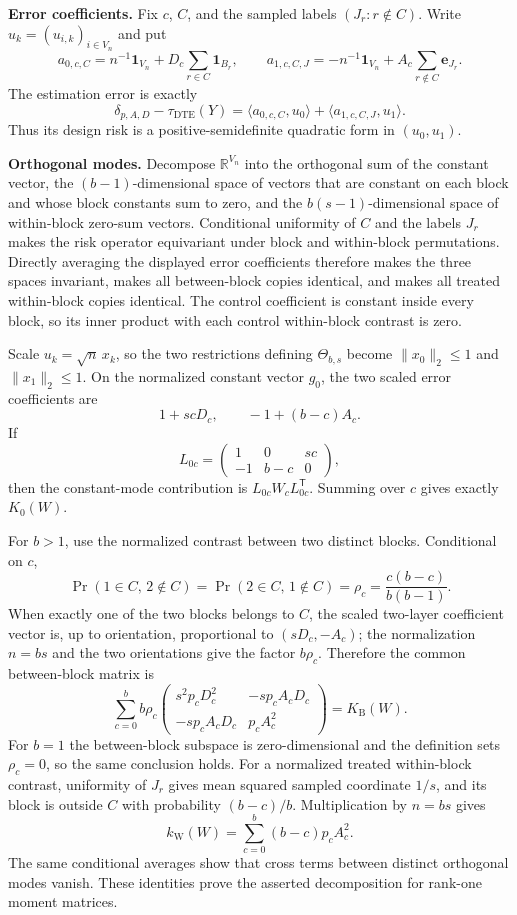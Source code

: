 \textbf{Error coefficients.}  Fix \(c\), \(C\), and the sampled labels \((J_r:r\notin C)\).  Write \(u_k=(u_{i,k})_{i\in V_n}\) and put
\[
a_{0,c,C}=n^{-1}\mathbf 1_{V_n}+D_c\sum_{r\in C}\mathbf 1_{B_r},
\qquad
a_{1,c,C,J}=-n^{-1}\mathbf 1_{V_n}+A_c\sum_{r\notin C}\mathbf e_{J_r}.
\]
The estimation error is exactly
\[
\delta_{p,A,D}-\tau_{\mathrm{DTE}}(Y)
=\langle a_{0,c,C},u_0\rangle+\langle a_{1,c,C,J},u_1\rangle.
\]
Thus its design risk is a positive-semidefinite quadratic form in \((u_0,u_1)\).

\textbf{Orthogonal modes.}  Decompose \(\mathbb R^{V_n}\) into the orthogonal sum of the constant vector, the \((b-1)\)-dimensional space of vectors that are constant on each block and whose block constants sum to zero, and the \(b(s-1)\)-dimensional space of within-block zero-sum vectors.  Conditional uniformity of \(C\) and the labels \(J_r\) makes the risk operator equivariant under block and within-block permutations.  Directly averaging the displayed error coefficients therefore makes the three spaces invariant, makes all between-block copies identical, and makes all treated within-block copies identical.  The control coefficient is constant inside every block, so its inner product with each control within-block contrast is zero.

Scale \(u_k=\sqrt n\,x_k\), so the two restrictions defining \(\Theta_{b,s}\) become \(\|x_0\|_2\le1\) and \(\|x_1\|_2\le1\).  On the normalized constant vector \(g_0\), the two scaled error coefficients are
\[
1+scD_c,
\qquad
-1+(b-c)A_c.
\]
If
\[
L_{0c}=\begin{pmatrix}1&0&sc\\-1&b-c&0\end{pmatrix},
\]
then the constant-mode contribution is \(L_{0c}W_cL_{0c}^{\mathsf T}\).  Summing over \(c\) gives exactly \(K_0(W)\).

For \(b>1\), use the normalized contrast between two distinct blocks.  Conditional on \(c\),
\[
\Pr(1\in C,\,2\notin C)=\Pr(2\in C,\,1\notin C)
=\rho_c=\frac{c(b-c)}{b(b-1)}.
\]
When exactly one of the two blocks belongs to \(C\), the scaled two-layer coefficient vector is, up to orientation, proportional to \((sD_c,-A_c)\); the normalization \(n=bs\) and the two orientations give the factor \(b\rho_c\).  Therefore the common between-block matrix is
\[
\sum_{c=0}^b b\rho_c
\begin{pmatrix}
s^2p_cD_c^2&-sp_cA_cD_c\\
-sp_cA_cD_c&p_cA_c^2
\end{pmatrix}
=K_{\mathrm B}(W).
\]
For \(b=1\) the between-block subspace is zero-dimensional and the definition sets \(\rho_c=0\), so the same conclusion holds.  For a normalized treated within-block contrast, uniformity of \(J_r\) gives mean squared sampled coordinate \(1/s\), and its block is outside \(C\) with probability \((b-c)/b\).  Multiplication by \(n=bs\) gives
\[
k_{\mathrm W}(W)=\sum_{c=0}^b(b-c)p_cA_c^2.
\]
The same conditional averages show that cross terms between distinct orthogonal modes vanish.  These identities prove the asserted decomposition for rank-one moment matrices.

